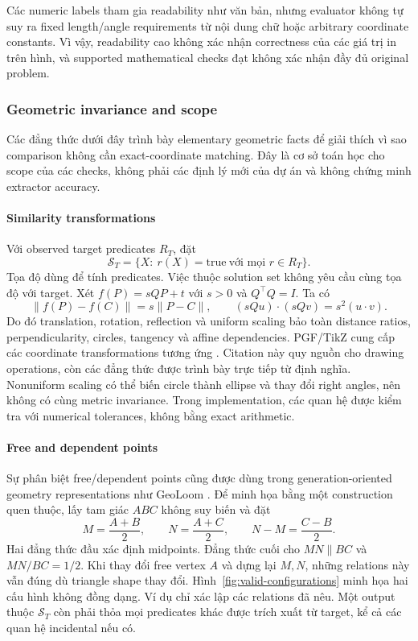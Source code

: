 \documentclass[a4paper,12pt]{article}
\begin{document}
Các numeric labels tham gia readability như văn bản, nhưng evaluator không tự suy ra fixed length/angle requirements từ nội dung chữ hoặc arbitrary coordinate constants. Vì vậy, readability cao không xác nhận correctness của các giá trị in trên hình, và supported mathematical checks đạt không xác nhận đầy đủ original problem.

\subsubsection{Geometric invariance and scope}
Các đẳng thức dưới đây trình bày elementary geometric facts để giải thích vì sao comparison không cần exact-coordinate matching. Đây là cơ sở toán học cho scope của các checks, không phải các định lý mới của dự án và không chứng minh extractor accuracy.

\paragraph{Similarity transformations}
Với observed target predicates $R_T$, đặt
\begin{equation}
\mathcal S_T=\{X:\ r(X)=\mathrm{true}\ \text{với mọi }r\in R_T\}.
\end{equation}
Tọa độ dùng để tính predicates. Việc thuộc solution set không yêu cầu cùng tọa độ với target. Xét $f(P)=sQP+t$ với $s>0$ và $Q^\top Q=I$. Ta có
\begin{equation}
\|f(P)-f(C)\|=s\|P-C\|,\qquad
(sQu)\cdot(sQv)=s^2(u\cdot v).
\end{equation}
Do đó translation, rotation, reflection và uniform scaling bảo toàn distance ratios, perpendicularity, circles, tangency và affine dependencies. PGF/TikZ cung cấp các coordinate transformations tương ứng \cite{ref4}. Citation này quy nguồn cho drawing operations, còn các đẳng thức được trình bày trực tiếp từ định nghĩa. Nonuniform scaling có thể biến circle thành ellipse và thay đổi right angles, nên không có cùng metric invariance. Trong implementation, các quan hệ được kiểm tra với numerical tolerances, không bằng exact arithmetic.

\paragraph{Free and dependent points}
Sự phân biệt free/dependent points cũng được dùng trong generation-oriented geometry representations như GeoLoom \cite{ref3}. Để minh họa bằng một construction quen thuộc, lấy tam giác $ABC$ không suy biến và đặt
\begin{equation}
M=\frac{A+B}{2},\qquad N=\frac{A+C}{2},\qquad
N-M=\frac{C-B}{2}.
\end{equation}
Hai đẳng thức đầu xác định midpoints. Đẳng thức cuối cho $MN\parallel BC$ và $MN/BC=1/2$. Khi thay đổi free vertex $A$ và dựng lại $M,N$, những relations này vẫn đúng dù triangle shape thay đổi. Hình~\ref{fig:valid-configurations} minh họa hai cấu hình không đồng dạng. Ví dụ chỉ xác lập các relations đã nêu. Một output thuộc $\mathcal S_T$ còn phải thỏa mọi predicates khác được trích xuất từ target, kể cả các quan hệ incidental nếu có.
\end{document}
